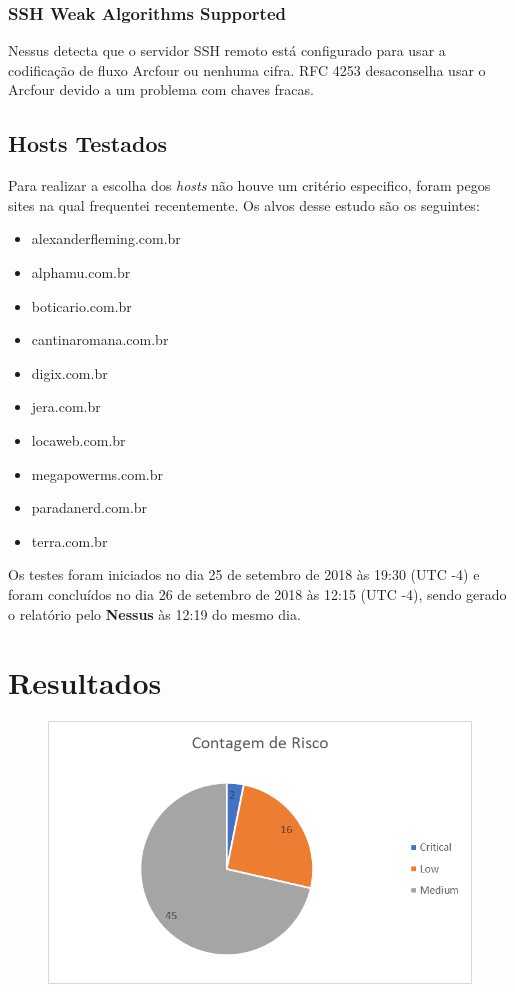 \documentclass[
	12pt,				%
	openright,			%
	twoside,			%
	a4paper,			%
	english,			%
	french,				%
	spanish,			%
	brazil				%
	]{abntex2}
\begin{document}
\subsection{SSH Weak Algorithms Supported}
Nessus detecta que o servidor SSH remoto está configurado para usar a codificação de fluxo Arcfour ou nenhuma cifra. RFC 4253 desaconselha usar o Arcfour devido a um problema com chaves fracas.

\section{Hosts Testados}
Para realizar a escolha dos \textit{hosts} não houve um critério especifico, foram pegos sites na qual frequentei recentemente. Os alvos desse estudo são os seguintes:
\begin{itemize}
	\item alexanderfleming.com.br
	\item alphamu.com.br
	\item boticario.com.br
	\item cantinaromana.com.br
	\item digix.com.br
	\item jera.com.br
	\item locaweb.com.br
	\item megapowerms.com.br
	\item paradanerd.com.br
	\item terra.com.br
\end{itemize}
Os testes foram iniciados no dia 25 de setembro de 2018 às 19:30 (UTC -4) e foram concluídos no dia 26 de setembro de 2018 às 12:15 (UTC -4), sendo gerado o relatório pelo \textbf{Nessus} às 12:19 do mesmo dia.
\chapter{Resultados}
\begin{figure}[h]
	\centering
	\includegraphics[width=0.7\linewidth]{Imagens/screenshot001}
	\caption[Contagem de Risco]{}
	\label{contagem_de_risco}
\end{figure}
\end{document}
